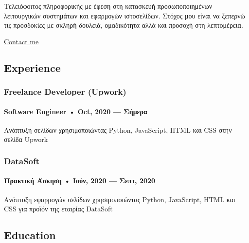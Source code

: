 \documentclass[
]{article}
\begin{document}
Τελειόφοιτος πληροφορικής με έφεση στη κατασκευή προσωποποιημένων
λειτουργικών συστημάτων και εφαρμογών ιστοσελίδων. Στόχος μου είναι να
ξεπερνώ τις προσδοκίες με σκληρή δουλειά, ομαδικότητα αλλά και προσοχή
στη λεπτομέρεια.

\href{mailto:deadoralive1908@ionio.gr}{Contact me}

\hypertarget{experience}{%
\subsection{Experience}\label{experience}}

\hypertarget{freelance-developer-upwork}{%
\subsubsection{Freelance Developer
(Upwork)}\label{freelance-developer-upwork}}

\hypertarget{software-engineer-oct-2020-ux3c3ux3aeux3bcux3b5ux3c1ux3b1}{%
\paragraph{Software Engineer • Oct, 2020 ---
Σήμερα}\label{software-engineer-oct-2020-ux3c3ux3aeux3bcux3b5ux3c1ux3b1}}

Ανάπτυξη σελίδων χρησιμοποιώντας Python, JavaScript, HTML και CSS στην
σελίδα Upwork

\hypertarget{datasoft}{%
\subsubsection{DataSoft}\label{datasoft}}

\hypertarget{ux3c0ux3c1ux3b1ux3baux3c4ux3b9ux3baux3ae-ux3acux3c3ux3baux3b7ux3c3ux3b7-ux3b9ux3bfux3cdux3bd-2020-ux3c3ux3b5ux3c0ux3c4-2020}{%
\paragraph{Πρακτική Άσκηση • Ιούν, 2020 --- Σεπτ,
2020}\label{ux3c0ux3c1ux3b1ux3baux3c4ux3b9ux3baux3ae-ux3acux3c3ux3baux3b7ux3c3ux3b7-ux3b9ux3bfux3cdux3bd-2020-ux3c3ux3b5ux3c0ux3c4-2020}}

Ανάπτυξη εφαρμογών σελίδων χρησιμοποιώντας Python, JavaScript, HTML και
CSS για προϊόν της εταιρίας DataSoft

\hypertarget{education}{%
\subsection{Education}\label{education}}
\end{document}
